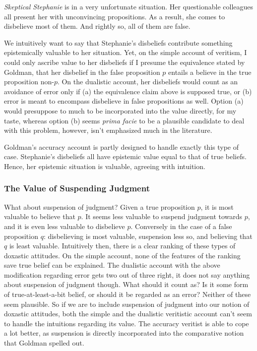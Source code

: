 \documentclass[12pt,numbers=noenddot]{scrartcl}
\begin{document}
\begin{description}
   \item \emph{Skeptical Stephanie} is in a very unfortunate situation. Her questionable colleagues all present her with unconvincing propositions. As a result, she comes to disbelieve most of them. And rightly so, all of them are false.
\end{description}

We intuitively want to say that Stephanie's disbeliefs contribute something epistemically valuable to her situation. Yet, on the simple account of veritism, I could only ascribe value to her disbeliefs if I presume the equivalence stated by Goldman, that her disbelief in the false proposition $p$ entails a believe in the true proposition non-$p$. On the dualistic account, her disbeliefs would count as an avoidance of error only if (a) the equivalence claim above is supposed true, or (b) error is meant to encompass disbelieve in false propositions as well. Option (a) would presuppose to much to be incorporated into the value directly, for my taste, whereas option (b) seems \emph{prima facie} to be a plausible candidate to deal with this problem, however, isn't emphasized much in the literature.

Goldman's accuracy account is partly designed to handle exactly this type of case. Stephanie's disbeliefs all have epistemic value equal to that of true beliefs. Hence, her epistemic situation is valuable, agreeing with intuition.

\subsubsection{The Value of Suspending Judgment}

What about suspension of judgment? Given a true proposition $p$, it is most valuable to believe that $p$. It seems less valuable to suspend judgment towards $p$, and it is even less valuable to disbelieve $p$. Conversely in the case of a false proposition $q$: disbelieving is most valuable, suspension less so, and believing that $q$ is least valuable. Intuitively then, there is a clear ranking of these types of doxastic attitudes. On the simple account, none of the features of the ranking save true belief can be explained. The dualistic account with the above modification regarding error gets two out of three right, it does not say anything about suspension of judgment though. What should it count as? Is it some form of true-at-least-a-bit belief, or should it be regarded as an error? Neither of these seem plausible. So if we are to include suspension of judgment into our notion of doxastic attitudes, both the simple and the dualistic veritistic account can't seem to handle the intuitions regarding its value. The accuracy veritist is able to cope a lot better, as suspension is directly incorporated into the comparative notion that Goldman spelled out.
\end{document}
